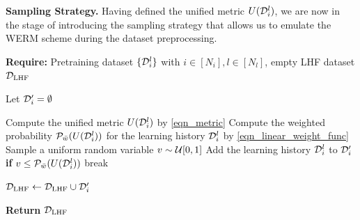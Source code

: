 \documentclass{article}
\begin{document}
\textbf{Sampling Strategy.}
%
Having defined the unified metric $U({\mathcal D}_i^l)$, we are now in the stage of introducing the sampling strategy that allows us to emulate the WERM scheme during the dataset preprocessing.
%
%
\begin{algorithm}
\caption{Learning History Filtering (LHF)}         
\label{alg_lhf}
\begin{algorithmic}[1]

        \STATE \textbf{Require:} Pretraining dataset $\{{\mathcal D}_i^l\}$ with $i \in [N_i], l \in [N_l]$, empty LHF dataset ${\mathcal D}_\text{LHF}$


            \STATE Let ${\mathcal D}_i' = \emptyset$
                    

                    \STATE Compute the unified metric $U({\mathcal D}_i^l)$ by \eqref{eqn_metric}
                    \STATE Compute the weighted probability $\mathcal{P}_{\bar{w}}(U({\mathcal D}_i^l))$ for the learning history ${\mathcal D}_i^l$ by \eqref{eqn_linear_weight_func}
                    \STATE Sample a uniform random variable $v \sim {\ensuremath{\mathcal U}}[0, 1]$
                    \STATE Add the learning history ${\mathcal D}_i^l$ to ${\mathcal D}_i'$ \textbf{if} $v \leq \mathcal{P}_{\bar{w}}(U({\mathcal D}_i^l))$
                    \STATE break
                    \ENDIF
                \ENDFOR
            \ENDWHILE
 
            \STATE ${\mathcal D}_\text{LHF} \leftarrow {\ensuremath{\mathcal D}}_\text{LHF} \cup {\ensuremath{\mathcal D}}_i'$
        \ENDFOR
        
        \STATE \textbf{Return} ${\mathcal D}_\text{LHF}$
\end{algorithmic}
\end{algorithm}
%
%
\end{document}

